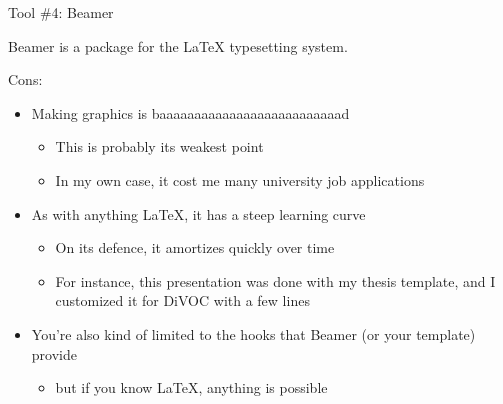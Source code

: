 \documentclass[aspectratio=169]{divoc}
\begin{document}
\begin{frame}{Tool \#4: Beamer}
  \begin{center}
    Beamer is a package for the LaTeX typesetting system.
  \end{center}

  Cons:
  \begin{itemize}
    \item Making graphics is baaaaaaaaaaaaaaaaaaaaaaaaaad
          \begin{itemize}
            \item This is probably its weakest point
            \item In my own case, it cost me many university job applications
          \end{itemize}
    \item As with anything LaTeX, it has a steep learning curve
          \begin{itemize}
            \item On its defence, it amortizes quickly over time
            \item For instance, this presentation was done with my thesis template, and I customized it for DiVOC with a few lines
          \end{itemize}
    \item You're also kind of limited to the hooks that Beamer (or your template) provide
          \begin{itemize}
            \item but if you know LaTeX, anything is possible 
          \end{itemize}
  \end{itemize}
\end{frame}
\end{document}
